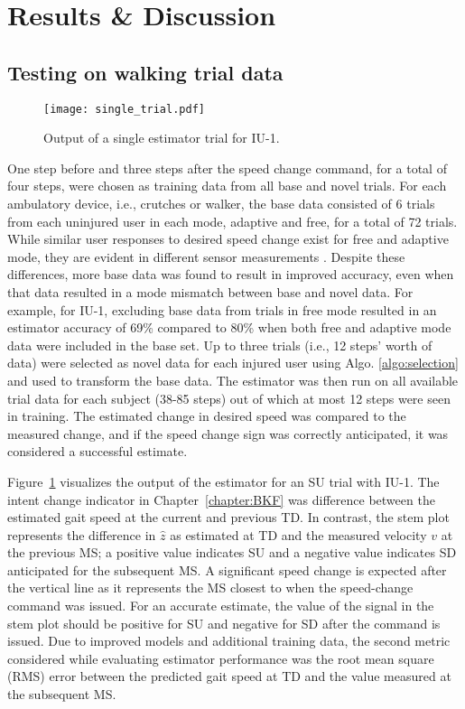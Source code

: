 \section{Results \& Discussion} \label{sec:results}

\subsection{Testing on walking trial data}

\begin{figure}
	\centering
	\texttt{[image: single\_trial.pdf]}
	\caption{Output of a single estimator trial for IU-1.}\label{fig:single_trial}
\end{figure}

One step before and three steps after the speed change command, for a total of four steps, were chosen as training data from all base and novel trials. For each ambulatory device, i.e., crutches or walker, the base data consisted of 6 trials from each uninjured user in each mode, adaptive and free, for a total of 72 trials. While similar user responses to desired speed change exist for free and adaptive mode, they are evident in different sensor measurements \cite{karulkar2021using}. Despite these differences, more base data was found to result in improved accuracy, even when that data resulted in a mode mismatch between base and novel data. For example, for IU-1, excluding base data from trials in free mode resulted in an estimator accuracy of 69\% compared to 80\% when both free and adaptive mode data were included in the base set. Up to three trials (i.e., 12 steps' worth of data) were selected as novel data for each injured user using Algo. \ref{algo:selection} and used to transform the base data. The estimator was then run on all available trial data for each subject (38-85 steps) out of which at most 12 steps were seen in training. The estimated change in desired speed was compared to the measured change, and if the speed change sign was correctly anticipated, it was considered a successful estimate.

Figure~\ref{fig:single_trial} visualizes the output of the estimator for an SU trial with IU-1. The intent change indicator in Chapter~\ref{chapter:BKF} was difference between the estimated gait speed at the  current and previous TD. In contrast, the stem plot represents the difference in $ \hat{z} $ as estimated at TD and the measured velocity $v$ at the previous MS; a positive value indicates SU and a negative value indicates SD anticipated for the subsequent MS. A significant speed change is expected after the vertical line as it represents the MS closest to when the speed-change command was issued. For an accurate estimate, the value of the signal in the stem plot should be positive for SU and negative for SD after the command is issued. Due to improved models and additional training data, the second metric considered while evaluating estimator performance was the root mean square (RMS) error between the predicted gait speed at TD and the value measured at the subsequent MS. 

